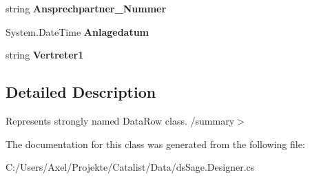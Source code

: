 \begin{DoxyCompactItemize}
\item 
string {\bfseries Ansprechpartner\+\_\+\+Nummer}\hypertarget{class_products_1_1_data_1_1ds_sage_1_1_customer_row_a94e5cbd74c02dd040e9ebbebd3b788e8}{}\label{class_products_1_1_data_1_1ds_sage_1_1_customer_row_a94e5cbd74c02dd040e9ebbebd3b788e8}

\item 
System.\+Date\+Time {\bfseries Anlagedatum}\hypertarget{class_products_1_1_data_1_1ds_sage_1_1_customer_row_ac1637440a590cbc5b34f6504ee967bee}{}\label{class_products_1_1_data_1_1ds_sage_1_1_customer_row_ac1637440a590cbc5b34f6504ee967bee}

\item 
string {\bfseries Vertreter1}\hypertarget{class_products_1_1_data_1_1ds_sage_1_1_customer_row_ac671a9fc8809722375c783c066687886}{}\label{class_products_1_1_data_1_1ds_sage_1_1_customer_row_ac671a9fc8809722375c783c066687886}

\end{DoxyCompactItemize}


\subsection{Detailed Description}
Represents strongly named Data\+Row class. /summary$>$ 

The documentation for this class was generated from the following file\+:\begin{DoxyCompactItemize}
\item 
C\+:/\+Users/\+Axel/\+Projekte/\+Catalist/\+Data/ds\+Sage.\+Designer.\+cs\end{DoxyCompactItemize}
